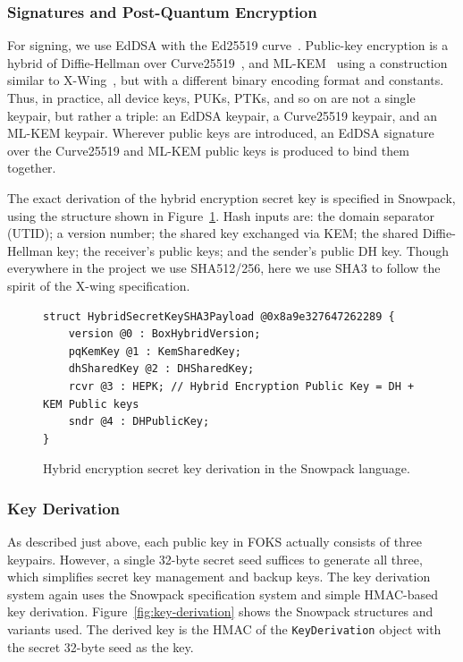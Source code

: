 \subsubsection{Signatures and Post-Quantum Encryption}

For signing, we use EdDSA with the Ed25519 curve~\cite{eddsa}.  Public-key
encryption is a hybrid of Diffie-Hellman over
Curve25519~\cite{bernstein2006curve25519}, and ML-KEM~\cite{nist-fips-203} using a
construction similar to X-Wing~\cite{xwing}, but with a different binary
encoding format and constants. Thus, in practice, all device keys, PUKs,
PTKs, and so on are not a single keypair, but rather a triple: an EdDSA 
keypair, a Curve25519 keypair, and an ML-KEM keypair. Wherever public keys
are introduced, an EdDSA signature over the Curve25519 and ML-KEM public keys
is produced to bind them together.

The exact derivation of the hybrid encryption secret key is specified in 
Snowpack, using the structure shown in Figure~\ref{fig:xwing}. Hash inputs are:
the domain separator (UTID); a version number; the shared key exchanged via KEM;
the shared Diffie-Hellman key; the receiver's public keys; and the sender's
public DH key. Though everywhere in the project we use SHA512/256, here we 
use SHA3 to follow the spirit of the X-wing specification.

\begin{figure}[ht]
  \centering
  \begin{verbatim}
struct HybridSecretKeySHA3Payload @0x8a9e327647262289 {
    version @0 : BoxHybridVersion;
    pqKemKey @1 : KemSharedKey;
    dhSharedKey @2 : DHSharedKey; 
    rcvr @3 : HEPK; // Hybrid Encryption Public Key = DH + KEM Public keys
    sndr @4 : DHPublicKey;
}
  \end{verbatim}
  \caption{Hybrid encryption secret key derivation in the Snowpack language.}
  \label{fig:xwing}
\end{figure}

\subsubsection{Key Derivation}
\label{sec:xwing-key-derivation}

As described just above, each public key in FOKS actually consists of three keypairs. However,
a single 32-byte secret seed suffices to generate all three, which simplifies secret key
management and backup keys.  The key derivation system again uses the Snowpack specification
system and simple HMAC-based key derivation. Figure~\ref{fig:key-derivation} shows the 
Snowpack structures and variants used. The derived key is the HMAC of the \texttt{KeyDerivation} object
with the secret 32-byte seed as the key.

